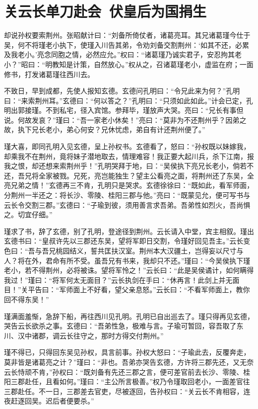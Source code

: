 \chapter{关云长单刀赴会~伏皇后为国捐生}

却说孙权要索荆州。张昭献计曰：“刘备所倚仗者，诸葛亮耳。其兄诸葛瑾今仕于吴，何不将瑾老小执下，使瑾入川告其弟，令劝刘备交割荆州：‘如其不还，必累及我老小。’亮念同胞之情，必然应允。”权曰：“诸葛瑾乃诚实君子，安忍拘其老小？”昭曰：“明教知是计策，自然放心。”权从之，召诸葛瑾老小，虚监在府；一面修书，打发诸葛瑾往西川去。

不致日，早到成都，先使人报知玄德。玄德问孔明曰：“令兄此来为何？”孔明曰：“来索荆州耳。”玄德曰：“何以答之？”孔明曰：“只须如此如此。”计会已定，孔明出郭接瑾。不到私宅，径入宾馆。参拜毕，瑾放声大哭。亮曰：“兄长有事但说。何故发哀？”瑾曰：“吾一家老小休矣！”亮曰：“莫非为不还荆州乎？因弟之故，执下兄长老小，弟心何安？兄休忧虑，弟自有计还荆州便了。”

瑾大喜，即同孔明入见玄德，呈上孙权书。玄德看了，怒曰：“孙权既以妹嫁我，却乘我不在荆州，竟将妹子潜地取去，情理难容！我正要大起川兵，杀下江南，报我之恨，却还想来索荆州乎！”孔明哭拜于地，曰：“吴侯执下亮兄长老小，倘若不还，吾兄将全家被戮。兄死，亮岂能独生？望主公看亮之面，将荆州还了东吴，全亮兄弟之情！”玄德再三不肯，孔明只是哭求。玄德徐徐曰：“既如此，看军师面，分荆州一半还之：将长沙、零陵、桂阳三郡与他。”亮曰：“既蒙见允，便可写书与云长令交割三郡。”玄德曰：“子瑜到彼，须用善言求吾弟。吾弟性如烈火，吾尚惧之。切宜仔细。”

瑾求了书，辞了玄德，别了孔明，登途径到荆州。云长请入中堂，宾主相叙。瑾出玄德书曰：“皇叔许先以三郡还东吴，望将军即日交割，令瑾好回见吾主。”云长变色曰：“吾与吾兄桃园结义，誓共匡扶汉室。荆州本大汉疆土，岂得妄以尺寸与人？将在外，君命有所不受。虽吾兄有书来，我却只不还。”瑾曰：“今吴侯执下瑾老小，若不得荆州，必将被诛。望将军怜之！”云长曰：“此是吴侯谲计，如何瞒得我过！”瑾曰：“将军何太无面目？”云长执剑在手曰：“休再言！此剑上并无面目！”关平告曰：“军师面上不好看，望父亲息怒。”云长曰：“不看军师面上，教你回不得东吴！”

瑾满面羞惭，急辞下船，再往西川见孔明。孔明已自出巡去了。瑾只得再见玄德，哭告云长欲杀之事。玄德曰：“吾弟性急，极难与言。子瑜可暂回，容吾取了东川、汉中诸郡，调云长往守之，那时方得交付荆州。”

瑾不得已，只得回东吴见孙权，具言前事。孙权大怒曰：“子瑜此去，反覆奔走，莫非皆是诸葛亮之计？”瑾曰：“非也。吾弟亦哭告玄德，方许将三郡先还，又无奈云长恃顽不肯，”孙权曰：“既刘备有先还三郡之言，便可差官前去长沙、零陵、桂阳三郡赴任，且看如何。”瑾曰：“主公所言极善。”权乃令瑾取回老小，一面差官往三郡赴任。不一日，三郡差去官吏，尽被逐回，告孙权曰：“关云长不肯相容，连夜赶逐回吴。迟后者便要杀。”

